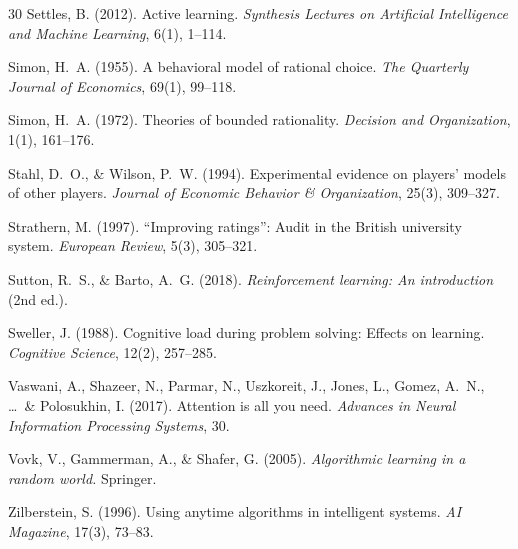 \documentclass[11pt,a4paper]{article}
\begin{document}
\begin{thebibliography}{30}
Settles, B. (2012).
\newblock Active learning.
\newblock \emph{Synthesis Lectures on Artificial Intelligence and Machine Learning}, 6(1), 1--114.

Simon, H.~A. (1955).
\newblock A behavioral model of rational choice.
\newblock \emph{The Quarterly Journal of Economics}, 69(1), 99--118.

Simon, H.~A. (1972).
\newblock Theories of bounded rationality.
\newblock \emph{Decision and Organization}, 1(1), 161--176.

Stahl, D.~O., \& Wilson, P.~W. (1994).
\newblock Experimental evidence on players' models of other players.
\newblock \emph{Journal of Economic Behavior \& Organization}, 25(3), 309--327.

Strathern, M. (1997).
\newblock ``Improving ratings'': Audit in the British university system.
\newblock \emph{European Review}, 5(3), 305--321.

Sutton, R.~S., \& Barto, A.~G. (2018).
\newblock \emph{Reinforcement learning: An introduction} (2nd ed.).

Sweller, J. (1988).
\newblock Cognitive load during problem solving: Effects on learning.
\newblock \emph{Cognitive Science}, 12(2), 257--285.

Vaswani, A., Shazeer, N., Parmar, N., Uszkoreit, J., Jones, L., Gomez, A.~N., \ldots\ \& Polosukhin, I. (2017).
\newblock Attention is all you need.
\newblock \emph{Advances in Neural Information Processing Systems}, 30.

Vovk, V., Gammerman, A., \& Shafer, G. (2005).
\newblock \emph{Algorithmic learning in a random world.}
\newblock Springer.

Zilberstein, S. (1996).
\newblock Using anytime algorithms in intelligent systems.
\newblock \emph{AI Magazine}, 17(3), 73--83.

\end{thebibliography}
\end{document}
